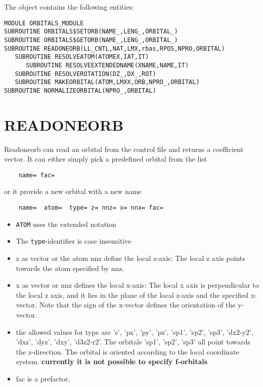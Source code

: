 \documentclass[11pt,a4paper]{report}
\begin{document}
The object contains the following entities:
\begin{verbatim}
MODULE ORBITALS_MODULE
SUBROUTINE ORBITALS$SETORB(NAME_,LENG_,ORBITAL_)
SUBROUTINE ORBITALS$GETORB(NAME_,LENG_,ORBITAL_)
SUBROUTINE READONEORB(LL_CNTL,NAT,LMX,rbas,RPOS,NPRO,ORBITAL)
   SUBROUTINE RESOLVEATOM(ATOMEX,IAT,IT)
      SUBROUTINE RESOLVEEXTENDEDNAME(XNAME,NAME,IT)
   SUBROUTINE RESOLVEROTATION(DZ_,DX_,ROT)
   SUBROUTINE MAKEORBITAL(ATOM,LMXX,ORB,NPRO_,ORBITAL)
SUBROUTINE NORMALIZEORBITAL(NPRO_,ORBITAL)
\end{verbatim}


\section{READONEORB}
Readoneorb can read an orbital from the control file and returns a
coefficient vector. It can either simply pick a predefined orbital
from the list
\begin{verbatim}
    name= fac= 
\end{verbatim}
or it provide a new orbital with a new name
\begin{verbatim}
    name=  atom=  type= z= nnz= x= nnx= fac=
\end{verbatim}
\begin{itemize}
\item \verb|ATOM| uses the extended notation
\item The \verb|type|-identifier is case insensitive
\item z as vector or the atom nnz define the local z-axis: The
  local z axis points towards the atom specified by nnz.
\item x as vector or nnz defines the local x-axis: The local x axis is
  perpendicular to the local z axis, and it lies in the plane of the
  local z-axis and the specified x-vector. Note that the sign of the
  x-vector defines the orientation of the y-vector.
\item the allowed values for type are 's', 'px', 'py', 'pz', 'sp1',
  'sp2', 'sp3', 'dx2-y2', 'dxz', 'dyz', 'dxy', 'd3z2-r2'. The orbitals
  'sp1', 'sp2', 'sp3' all point towards the z-direction. The orbital
  is oriented according to the local coordinate
  system. \textbf{currently it is not possible to specify f-orbitals}
\item fac is a prefactor.
\end{itemize}
\end{document}
